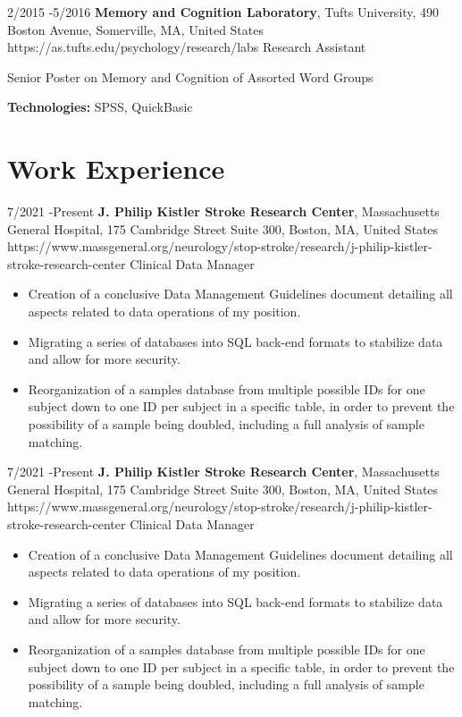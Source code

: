 \documentclass[10pt]{article} %
\begin{document}

\job
{2/2015 -}{5/2016}
{\textbf{Memory and Cognition Laboratory}, Tufts University, 490 Boston Avenue, Somerville, MA, United States}
{https://as.tufts.edu/psychology/research/labs}
{Research Assistant}
{
Senior Poster on Memory and Cognition of Assorted Word Groups \\
\rule{0mm}{5mm}\textbf{Technologies:} SPSS, QuickBasic}


\section{Work Experience}

\job
{7/2021 -}{Present}
{\textbf{J. Philip Kistler Stroke Research Center}, Massachusetts General Hospital, 175 Cambridge Street Suite 300, Boston, MA, United States}
{https://www.massgeneral.org/neurology/stop-stroke/research/j-philip-kistler-stroke-research-center}
{Clinical Data Manager}
{
\begin{itemize}
\item Creation of a conclusive Data Management Guidelines document detailing all aspects related to data operations of my position.
\item Migrating a series of databases into SQL back-end formats to stabilize data and allow for more security.
\item Reorganization of a samples database from multiple possible IDs for one subject down to one ID per subject in a specific table, in order to prevent the possibility of a sample being doubled, including a full analysis of sample matching.
\end{itemize}
}


\job
{7/2021 -}{Present}
{\textbf{J. Philip Kistler Stroke Research Center}, Massachusetts General Hospital, 175 Cambridge Street Suite 300, Boston, MA, United States}
{https://www.massgeneral.org/neurology/stop-stroke/research/j-philip-kistler-stroke-research-center}
{Clinical Data Manager}
{
\begin{itemize}
\item Creation of a conclusive Data Management Guidelines document detailing all aspects related to data operations of my position.
\item Migrating a series of databases into SQL back-end formats to stabilize data and allow for more security.
\item Reorganization of a samples database from multiple possible IDs for one subject down to one ID per subject in a specific table, in order to prevent the possibility of a sample being doubled, including a full analysis of sample matching.
\end{itemize}
}
\end{document}
